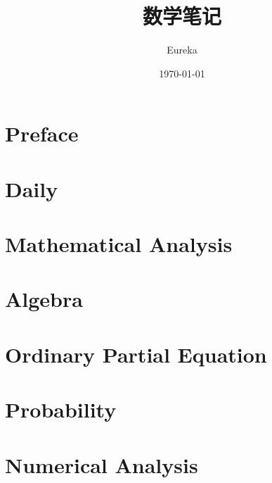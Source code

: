 \documentclass[cn, math=cm]{elegantbook}
\title{数学笔记}
\date{\today}
\author{Eureka}
\begin{document}
    \maketitle
    \frontmatter
    \tableofcontents
    \mainmatter
    
    \chapter*{Preface}   
    


    \chapter{Daily}
    


    \chapter{Mathematical Analysis}
    
    
    
    
    
    


    \chapter{Algebra}
    
    
    
    
    

    \chapter{Ordinary Partial Equation}
    
    
    
    


    \chapter{Probability}
    


    \chapter{Numerical Analysis}
    

    
\end{document}
